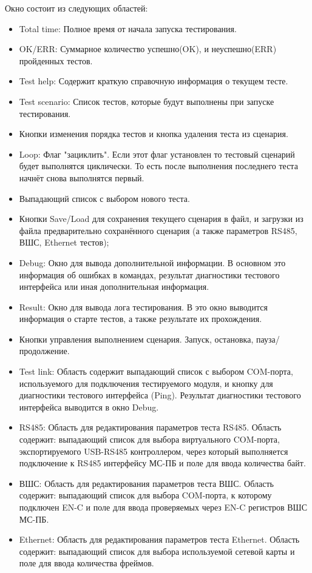 \documentclass[a4paper,14pt,bachelor]{disser}
\begin{document}
Окно состоит из следующих областей:
\begin{itemize}
	\item Total time: Полное время от начала запуска тестирования.
	\item OK/ERR: Суммарное количество успешно(OK), и неуспешно(ERR) пройденных тестов.
	\item Test help: Содержит краткую справочную информация о текущем тесте. 
	\item Test scenario: Список тестов, которые будут выполнены при запуске тестирования.
	\item Кнопки изменения порядка тестов и кнопка удаления теста из сценария.
	\item Loop: Флаг "зациклить". Если этот флаг установлен то тестовый сценарий будет выполнятся циклически. То есть после выполнения последнего теста начнёт снова выполнятся первый.
	\item Выпадающий список с выбором нового теста.
	\item Кнопки Save/Load для сохранения текущего сценария в файл, и загрузки из файла предварительно сохранённого сценария (а также параметров RS485, ВШС, Ethernet тестов);
	\item Debug: Окно для вывода дополнительной информации. В основном это информация об ошибках в командах, результат диагностики тестового интерфейса или иная дополнительная информация.
	\item Result: Окно для вывода лога тестирования. В это окно выводится информация о старте тестов, а также результате их прохождения.
	\item Кнопки управления выполнением сценария. Запуск, остановка, пауза/продолжение.
	\item Test link: Область содержит выпадающий список с выбором COM-порта, используемого для подключения тестируемого модуля, и кнопку для диагностики тестового интерфейса (Ping). Результат диагностики тестового интерфейса выводится в окно Debug.
	\item RS485: Область для редактирования параметров теста RS485. Область содержит: выпадающий список для выбора виртуального COM-порта, экспортируемого USB-RS485 контроллером, через который выполняется подключение к RS485 интерфейсу МС-ПБ и поле для ввода количества байт.
	\item ВШС: Область для редактирования параметров теста ВШС. Область содержит: выпадающий список для выбора COM-порта, к которому подключен EN-C и поле для ввода проверяемых через EN-C регистров ВШС МС-ПБ.
	\item Ethernet: Область для редактирования параметров теста Ethernet. Область содержит: выпадающий список для выбора используемой сетевой карты и поле для ввода количества фреймов.
\end{itemize}
\end{document}
